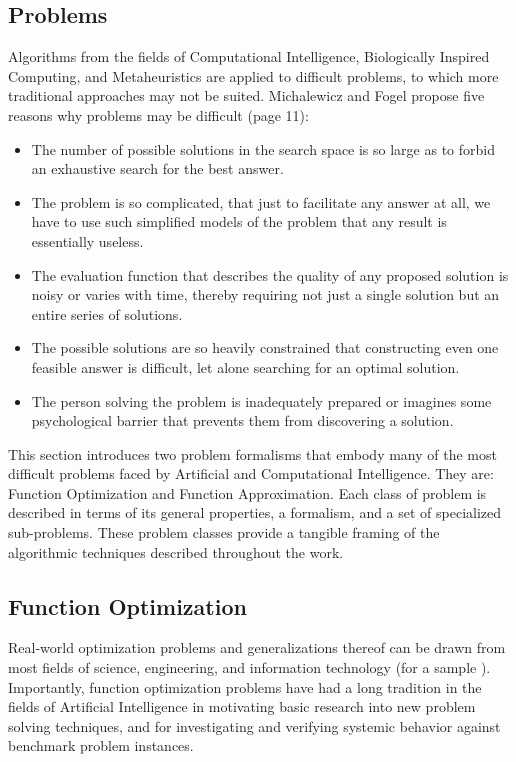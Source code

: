 \begin{bibunit}
\section{Problems}
\label{sec:problems}
Algorithms from the fields of Computational Intelligence, Biologically Inspired Computing, and Metaheuristics are applied to difficult problems, to which more traditional approaches may not be suited.
Michalewicz and Fogel propose five reasons why problems may be difficult \cite{Michalewicz2004} (page 11):
\begin{itemize}
	\item The number of possible solutions in the search space is so large as to forbid an exhaustive search for the best answer.
	\item The problem is so complicated, that just to facilitate any answer at all, we have to use such simplified models of the problem that any result is essentially useless.
	\item The evaluation function that describes the quality of any proposed solution is noisy or varies with time, thereby requiring not just a single solution but an entire series of solutions.
	\item The possible solutions are so heavily constrained that constructing even one feasible answer is difficult, let alone searching for an optimal solution.
	\item The person solving the problem is inadequately prepared or imagines some psychological barrier that prevents them from discovering a solution.
\end{itemize}

This section introduces two problem formalisms that embody many of the most difficult problems faced by Artificial and Computational Intelligence. They are: Function Optimization and Function Approximation. Each class of problem is described in terms of its general properties, a formalism, and a set of specialized sub-problems. These problem classes provide a tangible framing of the algorithmic techniques described throughout the work.

% 
%
\subsection{Function Optimization}
\label{subsec:function_optimization}
Real-world optimization problems and generalizations thereof can be drawn from most fields of science, engineering, and information technology (for a sample \cite{Ali1997, Toern1999}). Importantly, function optimization problems have had a long tradition in the fields of Artificial Intelligence in motivating basic research into new problem solving techniques, and for investigating and verifying systemic behavior against benchmark problem instances.


\end{bibunit}
